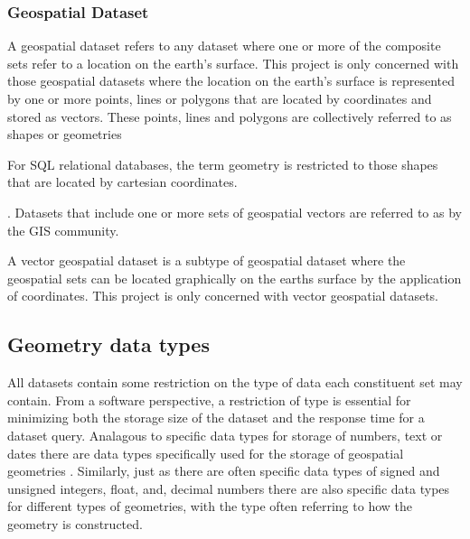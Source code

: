 \documentclass[letterpaper,11pt,english]{sphinxmanual}
\begin{document}
\subsubsection{Geospatial Dataset}
\label{\detokenize{concept:geospatial-dataset}}
A geospatial dataset refers to any dataset where one or more of the composite sets refer to a location on the earth’s surface.  This project is only concerned with those geospatial datasets where the location on the earth’s surface is represented by one or more points, lines or polygons that are located by coordinates and stored as vectors.  These points, lines and polygons are collectively referred to as shapes or geometries %
\begin{footnote}[5]\sphinxAtStartFootnote
For SQL relational databases, the term geometry is restricted to those shapes that are located by cartesian coordinates.
%
\end{footnote}.  Datasets that include one or more sets of geospatial vectors are referred to as  by the GIS community.

A vector geospatial dataset is a subtype of geospatial dataset where the geospatial sets can be located graphically on the earths surface by the application of coordinates.  This project is only concerned with vector geospatial datasets.


\subsection{Geometry data types}
\label{\detokenize{concept:geometry-data-types}}
All datasets contain some restriction on the type of data each constituent set may contain.  From a software perspective, a restriction of type is essential for minimizing both the storage size of the dataset and the response time for a dataset query.  Analagous to specific data types for storage of numbers, text or dates there are data types specifically used for the storage of geospatial geometries  .  Similarly, just as there are often specific data types of signed and unsigned integers, float, and, decimal numbers there are also specific data types for different types of geometries, with the type often referring to how the geometry is constructed.
\end{document}

